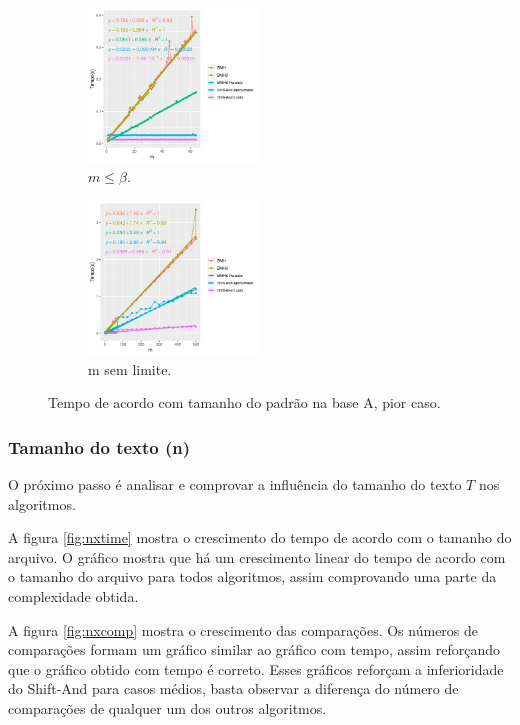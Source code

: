 \documentclass[11pt]{article}
\begin{document}
\begin{center}
\begin{figure}
\begin{subfigure}[b]{.49\linewidth}
\centering
\includegraphics[width=4.5cm]{mxtimewordboundworst}
\caption{$m\leq \beta$.}\label{fig:mxtimewordboundworst}
\end{subfigure}
\begin{subfigure}[b]{.49\linewidth}
\centering
\includegraphics[width=4.5cm]{mxtimenoboundworst}
\caption{m sem limite.}\label{fig:mxtimenoboundworst}
\end{subfigure}
\caption{Tempo de acordo com tamanho do padrão na base A, pior caso.}\label{fig:mxtimeworstg}
\end{figure}
\end{center}

\subsubsection{Tamanho do texto (n)}
\label{sec:orgb07aaf8}
O próximo passo é analisar e comprovar a influência do tamanho do texto \(T\) nos algoritmos.

A figura \ref{fig:nxtime} mostra o crescimento do tempo de acordo com o tamanho do arquivo. O gráfico mostra que há um crescimento linear do tempo de acordo com o tamanho do arquivo para todos algoritmos, assim comprovando uma parte da complexidade obtida.

A figura \ref{fig:nxcomp} mostra o crescimento das comparações. Os números de comparações formam um gráfico similar ao gráfico com tempo, assim reforçando que o gráfico obtido com tempo é correto. Esses gráficos reforçam a inferioridade do Shift-And para casos médios, basta observar a diferença do número de comparações de qualquer um dos outros algoritmos.
\end{document}
